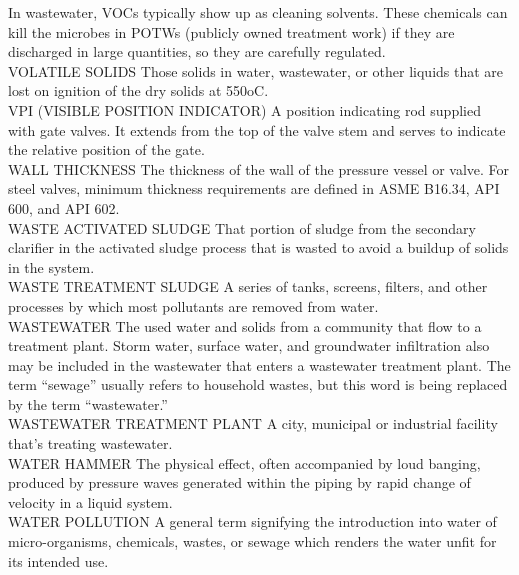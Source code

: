 In wastewater, VOCs typically show up as cleaning solvents. These chemicals can kill the microbes in POTWs (publicly owned treatment work) if they are discharged in large quantities, so they are carefully regulated. 
\vspace{0.3cm}\\
VOLATILE SOLIDS
Those solids in water, wastewater, or other liquids that are lost on ignition of the dry solids at 550oC.
\vspace{0.3cm}\\
VPI (VISIBLE POSITION INDICATOR)
A position indicating rod supplied with gate valves. It extends from the top of the valve stem and serves to indicate the relative position of the gate.
\vspace{0.3cm}\\
WALL THICKNESS
The thickness of the wall of the pressure vessel or valve. For steel valves, minimum thickness requirements are defined in ASME B16.34, API 600, and API 602.
\vspace{0.3cm}\\
WASTE ACTIVATED SLUDGE
That portion of sludge from the secondary clarifier in the activated sludge process that is wasted to avoid a buildup of solids in the system.
\vspace{0.3cm}\\
WASTE TREATMENT SLUDGE
A series of tanks, screens, filters, and other processes by which most pollutants are removed from water.
\vspace{0.3cm}\\
WASTEWATER
The used water and solids from a community that flow to a treatment plant. Storm water, surface water, and groundwater infiltration also may be included in the wastewater that enters a wastewater treatment plant. The term “sewage” usually refers to household wastes, but this word is being replaced by the term “wastewater.”
\vspace{0.3cm}\\
WASTEWATER TREATMENT PLANT
A city, municipal or industrial facility that’s treating wastewater.
\vspace{0.3cm}\\
WATER HAMMER
The physical effect, often accompanied by loud banging, produced by pressure waves generated within the piping by rapid change of velocity in a liquid system.
\vspace{0.3cm}\\
WATER POLLUTION
A general term signifying the introduction into water of micro-organisms, chemicals, wastes, or sewage which renders the water unfit for its intended use.
